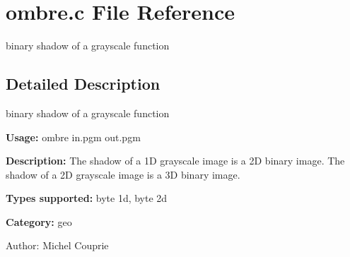 \section{ombre.c File Reference}
\label{ombre_8c}
binary shadow of a grayscale function 



\subsection{Detailed Description}
binary shadow of a grayscale function 

{\bf Usage:} ombre in.pgm out.pgm

{\bf Description:} The shadow of a 1D grayscale image is a 2D binary image. The shadow of a 2D grayscale image is a 3D binary image.

{\bf Types supported:} byte 1d, byte 2d

{\bf Category:} geo

\begin{Desc}
\item[Author:]Michel Couprie \end{Desc}
